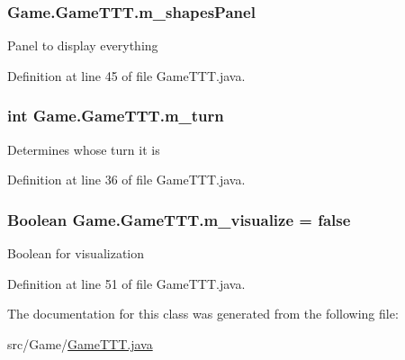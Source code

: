 \subsubsection[{m\+\_\+shapes\+Panel}]{ Game.\+Game\+T\+T\+T.\+m\+\_\+shapes\+Panel\hspace{0.3cm}{\ttfamily [private]}}\label{class_game_1_1_game_t_t_t_a6b2de64f05009047dd3a01867da865c0}
Panel to display everything 

Definition at line 45 of file Game\+T\+T\+T.\+java.

\hypertarget{class_game_1_1_game_t_t_t_a2a4f4d1d24717d2629a2560421e926bc}{}
\subsubsection[{m\+\_\+turn}]{\setlength{\rightskip}{0pt plus 5cm}int Game.\+Game\+T\+T\+T.\+m\+\_\+turn\hspace{0.3cm}{\ttfamily [private]}}\label{class_game_1_1_game_t_t_t_a2a4f4d1d24717d2629a2560421e926bc}
Determines whose turn it is 

Definition at line 36 of file Game\+T\+T\+T.\+java.

\hypertarget{class_game_1_1_game_t_t_t_ad1efe890e60af4826d664276e1e49ea4}{}
\subsubsection[{m\+\_\+visualize}]{\setlength{\rightskip}{0pt plus 5cm}Boolean Game.\+Game\+T\+T\+T.\+m\+\_\+visualize = false\hspace{0.3cm}{\ttfamily [private]}}\label{class_game_1_1_game_t_t_t_ad1efe890e60af4826d664276e1e49ea4}
Boolean for visualization 

Definition at line 51 of file Game\+T\+T\+T.\+java.



The documentation for this class was generated from the following file\+:\begin{DoxyCompactItemize}
\item 
src/\+Game/\hyperlink{_game_t_t_t_8java}{Game\+T\+T\+T.\+java}\end{DoxyCompactItemize}
